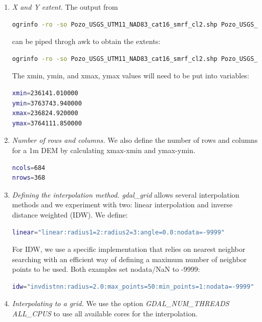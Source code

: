 \documentclass[a4paperpaper,,tablecaptionabove]{scrartcl}
\begin{document}
\begin{enumerate}
\def\labelenumi{\arabic{enumi}.}
\item
  \emph{X and Y extent.} The output from

\begin{lstlisting}[language=bash]
ogrinfo -ro -so Pozo_USGS_UTM11_NAD83_cat16_smrf_cl2.shp Pozo_USGS_UTM11_NAD83_cat16_smrf_cl2
\end{lstlisting}

  can be piped throgh awk to obtain the extents:

\begin{lstlisting}[language=bash]
ogrinfo -ro -so Pozo_USGS_UTM11_NAD83_cat16_smrf_cl2.shp Pozo_USGS_UTM11_NAD83_cat16_smrf_cl2 | awk '/Extent: /'
\end{lstlisting}

  The xmin, ymin, and xmax, ymax values will need to be put into
  variables:

\begin{lstlisting}[language=bash]
xmin=236141.010000
ymin=3763743.940000
xmax=236824.920000
ymax=3764111.850000
\end{lstlisting}
\item
  \emph{Number of rows and columns.} We also define the number of rows
  and columns for a 1m DEM by calculating xmax-xmin and ymax-ymin.

\begin{lstlisting}[language=bash]
ncols=684
nrows=368
\end{lstlisting}
\item
  \emph{Defining the interpolation method.} \emph{gdal\_grid} allows
  several interpolation methods and we experiment with two: linear
  interpolation and inverse distance weighted (IDW). We define:

\begin{lstlisting}[language=bash]
linear="linear:radius1=2:radius2=3:angle=0.0:nodata=-9999"
\end{lstlisting}

  For IDW, we use a specific implementation that relies on nearest
  neighbor searching with an efficient way of defining a maximum number
  of neighbor points to be used. Both examples set nodata/NaN to -9999:

\begin{lstlisting}[language=bash]
idw="invdistnn:radius=2.0:max_points=50:min_points=1:nodata=-9999"
\end{lstlisting}
\item
  \emph{Interpolating to a grid.} We use the option
  \emph{GDAL\_NUM\_THREADS ALL\_CPUS} to use all available cores for the
  interpolation.


\end{enumerate}
\end{document}
